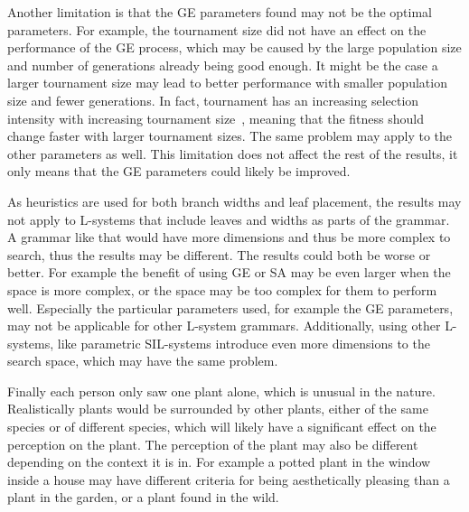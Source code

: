 Another limitation is that the \gls{GE} parameters found may not be the optimal parameters.
For example, the tournament size did not have an effect on the performance of the \gls{GE} process, which may be caused by the large population size and number of generations already being good enough.
It might be the case a larger tournament size may lead to better performance with smaller population size and fewer generations.
In fact, tournament has an increasing selection intensity with increasing tournament size~\cite{1995Blickle}, meaning that the fitness should change faster with larger tournament sizes.
The same problem may apply to the other parameters as well.
This limitation does not affect the rest of the results, it only means that the \gls{GE} parameters could likely be improved.

As heuristics are used for both branch widths and leaf placement, the results may not apply to \glspl{L-system} that include leaves and widths as parts of the grammar.
A grammar like that would have more dimensions and thus be more complex to search, thus the results may be different.
The results could both be worse or better.
For example the benefit of using \gls{GE} or \gls{SA} may be even larger when the space is more complex, or the space may be too complex for them to perform well.
Especially the particular parameters used, for example the \gls{GE} parameters, may not be applicable for other \gls{L-system} grammars.
Additionally, using other \glspl{L-system}, like parametric SIL-systems introduce even more dimensions to the search space, which may have the same problem.

Finally each person only saw one plant alone, which is unusual in the nature.
Realistically plants would be surrounded by other plants, either of the same species or of different species, which will likely have a significant effect on the perception on the plant.
The perception of the plant may also be different depending on the context it is in.
For example a potted plant in the window inside a house may have different criteria for being aesthetically pleasing than a plant in the garden, or a plant found in the wild.

